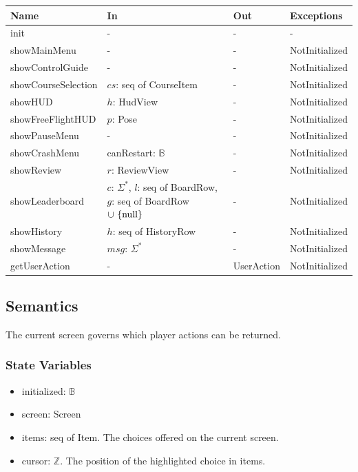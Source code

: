 \documentclass[12pt, titlepage]{article}
\newcommand{\nul}{\textnormal{null}}
\begin{document}
\begin{center}
\begin{minipage}{\textwidth}
\begin{tabularx}{\textwidth}{p{3.9cm} >{\raggedright\arraybackslash}X p{2.2cm}
p{2.6cm}}
\toprule
\textbf{Name} & \textbf{In} & \textbf{Out} & \textbf{Exceptions} \\
\midrule
init & - & - & - \\
showMainMenu & - & - & NotInitialized \\
showControlGuide & - & - & NotInitialized \\
showCourseSelection & $cs$: seq of CourseItem & - & NotInitialized \\
showHUD & $h$: HudView & - & NotInitialized \\
showFreeFlightHUD & $p$: Pose & - & NotInitialized \\
showPauseMenu & - & - & NotInitialized \\
showCrashMenu & canRestart: $\mathbb{B}$ & - & NotInitialized \\
showReview & $r$: ReviewView & - & NotInitialized \\
showLeaderboard & $c$: $\Sigma^*$, $l$: seq of BoardRow, $g$: seq of BoardRow
$\cup \ \{\nul\}$ & - & NotInitialized \\
showHistory & $h$: seq of HistoryRow & - & NotInitialized \\
showMessage & $msg$: $\Sigma^*$ & - & NotInitialized \\
getUserAction & - & UserAction & NotInitialized \\
\bottomrule
\end{tabularx}
\label{TblM3Access}
\end{minipage}
\end{center}

\subsection{Semantics}

The current screen governs which player actions can be returned.

\subsubsection{State Variables}

\begin{itemize}
\item initialized: $\mathbb{B}$
\item screen: Screen
\item items: seq of Item. The choices offered on the current screen.
\item cursor: $\mathbb{Z}$. The position of the highlighted choice in items.
\end{itemize}
\end{document}
